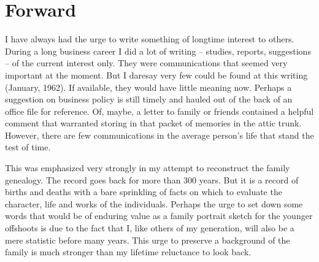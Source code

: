 \documentclass[12pt]{book}              %
\begin{document}
\chapter*{Forward}                %
% 

I have always had the urge to write something of longtime interest to others. During a long business career I did a lot of writing -- studies, reports, suggestions -- of the current interest only. They were communications that seemed very important at the moment. But I daresay very few could be found at this writing (January, 1962). If available, they would have little meaning now. Perhaps a suggestion on business policy is still timely and hauled out of the back of an office file for reference. Of, maybe, a letter to family or friends contained a helpful comment that warranted storing in that packet of memories in the attic trunk. However, there are few communications in the average person's life that stand the test of time.

This was emphasized very strongly in my attempt to reconstruct the family genealogy. The record goes back for more than 300 years. But it is a record of births and deaths with a bare sprinkling of facts on which to evaluate the character, life and works of the individuals. Perhaps the urge to set down some words that would be of enduring value as a family portrait sketch for the younger offshoots is due to the fact that I, like others of my generation, will also be a mere statistic before many years. This urge to preserve a background of the family is much stronger than my lifetime reluctance to look back. 
\end{document}
